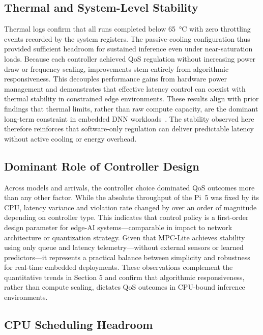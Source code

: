 \documentclass[acmsmall]{acmart}
\begin{document}
\subsection{Thermal and System-Level Stability}

Thermal logs confirm that all runs completed below 65~°C with zero throttling events recorded by the system registers.  
The passive-cooling configuration thus provided sufficient headroom for sustained inference even under near-saturation loads.  
Because each controller achieved QoS regulation without increasing power draw or frequency scaling, improvements stem entirely from algorithmic responsiveness.  
This decouples performance gains from hardware power management and demonstrates that effective latency control can coexist with thermal stability in constrained edge environments.  
These results align with prior findings that thermal limits, rather than raw compute capacity, are the dominant long-term constraint in embedded DNN workloads~\cite{sze2017efficient, sun2021thermml}.  
The stability observed here therefore reinforces that software-only regulation can deliver predictable latency without active cooling or energy overhead.

\subsection{Dominant Role of Controller Design}

Across models and arrivals, the controller choice dominated QoS outcomes more than any other factor.  
While the absolute throughput of the Pi~5 was fixed by its CPU, latency variance and violation rate changed by over an order of magnitude depending on controller type.  
This indicates that control policy is a first-order design parameter for edge-AI systems—comparable in impact to network architecture or quantization strategy.  
Given that MPC-Lite achieves stability using only queue and latency telemetry—without external sensors or learned predictors—it represents a practical balance between simplicity and robustness for real-time embedded deployments.  
These observations complement the quantitative trends in Section 5 and confirm that algorithmic responsiveness, rather than compute scaling, dictates QoS outcomes in CPU-bound inference environments.

\subsection{CPU Scheduling Headroom}
\end{document}
